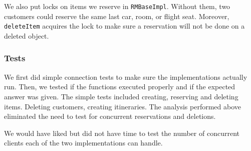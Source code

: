 \documentclass[12pt]{article}
\theoremstyle{plain}%
\theoremstyle{definition}
\theoremstyle{remark}
\newcommand{\java}[1]{{\lstinline!#1!}}
\begin{document}
We also put locks on items we reserve in \java{RMBaseImpl}. Without
them, two customers could reserve the same last car, room, or flight
seat. Moreover, \java{deleteItem} acquires the lock to make sure a
reservation will not be done on a deleted object.

\subsubsection*{Tests}
We first did simple connection tests to make sure the implementations
actually run. Then, we tested if the functions executed properly and
if the expected answer was given. The simple tests included creating,
reserving and deleting items. Deleting customers, creating
itineraries. The analysis performed above eliminated the need to test
for concurrent reservations and deletions. 

We would have liked but did not have time to test the number of
concurrent clients each of the two implementations can handle.
\end{document}
